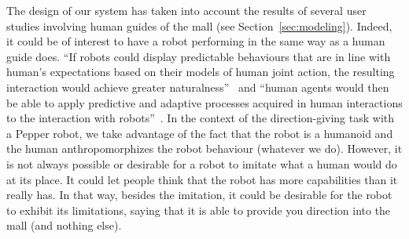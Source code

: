 \documentclass[a4paper,11pt,twoside]{StyleThese}
\begin{document}
The design of our system has taken into account the results of several user studies involving human guides of the mall (see Section~\ref{sec:modeling}). Indeed, it could be of interest to have a robot performing in the same way as a human guide does. ``If robots could display predictable behaviours that are in line with human's expectations based on their models of human joint action, the resulting interaction would achieve greater naturalness''~\cite[p.~17]{curioni_2017_joint} and ``human agents would then be able to apply predictive and adaptive processes acquired in human interactions to the interaction with robots''~\cite[p.17]{curioni_2017_joint}. In the context of the direction-giving task with a Pepper robot, we take advantage of the fact that the robot is a humanoid and the human anthropomorphizes the robot behaviour (whatever we do).
However, it is not always possible or desirable for a robot to imitate what a human would do at its place. It could let people think that the robot has more capabilities than it really has. In that way, besides the imitation, it could be desirable for the robot to exhibit its limitations, \eg saying that it is able to provide you direction into the mall (and nothing else).
%
%
\end{document}
